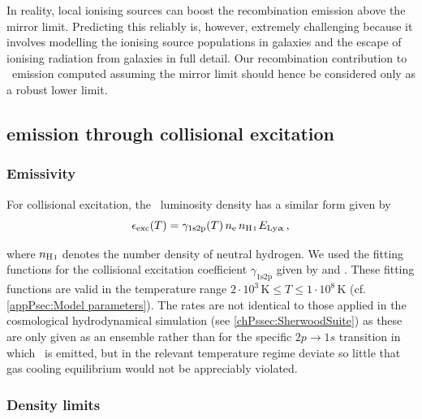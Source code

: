In reality, local ionising sources can boost the recombination emission above the mirror limit. Predicting this reliably is, however, extremely challenging because it involves modelling the ionising source populations in galaxies and the escape of ionising radiation from galaxies in full detail. Our recombination contribution to \lya\ emission computed assuming the mirror limit should hence be considered only as a robust lower limit.

\subsection{\texorpdfstring{\lya}{\lyatext} emission through collisional excitation}
\label{chPssec:Lya collisional excitation emission}

\subsubsection{Emissivity}
\label{chPsssec:Collisional excitation emissivity}

For collisional excitation, the \lya\ luminosity density has a similar form \citep{1990MNRAS.242..692S, 1991ApJ...380..302S, 2014PASA...31...40D, 2016MNRAS.462.1961S} given by
\begin{equation}
    \label{chPeq:Collisional excitation emissivity}
    \epsilon_\text{exc}(T) = \gamma_\text{1s2p} (T) \, n_\text{e} \, n_\text{\ion{H}{I}} \, E_\text{\lya} \, ,
\end{equation}

\noindent where $n_\text{\ion{H}{I}}$ denotes the number density of neutral hydrogen. We used the fitting functions for the collisional excitation coefficient $\gamma_\text{1s2p}$ given by \citet{1990MNRAS.242..692S} and \citet{1991ApJ...380..302S}. These fitting functions are valid in the temperature range $2 \cdot 10^3 \, \mathrm{K} \leq T \leq 1 \cdot 10^8 \, \mathrm{K}$ (cf. \cref{appPsec:Model parameters}). The rates are not identical to those applied in the cosmological hydrodynamical simulation (see \cref{chPssec:SherwoodSuite}) as these are only given as an ensemble rather than for the specific $2p \rightarrow 1s$ transition in which \lya\ is emitted, but in the relevant temperature regime deviate so little that gas cooling equilibrium would not be appreciably violated.

\subsubsection{Density limits}
\label{chPsssec:Density limits}

